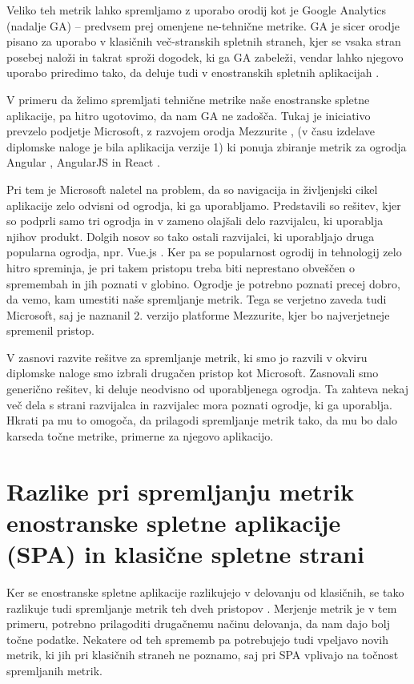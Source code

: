 \documentclass[a4paper, 12pt]{book}
\begin{document}
Veliko teh metrik lahko spremljamo z uporabo orodij kot je Google Analytics \cite{ga_website} (nadalje GA) -- predvsem prej omenjene ne-tehnične metrike. GA je sicer orodje pisano za uporabo v klasičnih več-stranskih spletnih straneh, kjer se vsaka stran posebej naloži in takrat sproži dogodek, ki ga GA zabeleži, vendar lahko njegovo uporabo priredimo tako, da deluje tudi v enostranskih spletnih aplikacijah \cite{ga_spa}.

V primeru da želimo spremljati tehnične metrike naše enostranske spletne aplikacije, pa hitro ugotovimo, da nam GA ne zadošča. Tukaj je iniciativo prevzelo podjetje Microsoft, z razvojem orodja Mezzurite \cite{mezzurite_website}, (v času izdelave diplomske naloge je bila aplikacija verzije 1) ki ponuja zbiranje metrik za ogrodja Angular \cite{angular_website}, AngularJS \cite{angularjs_website} in React \cite{react_website}.

Pri tem je Microsoft naletel na problem, da so navigacija in življenjski cikel aplikacije zelo odvisni od ogrodja, ki ga uporabljamo. Predstavili so rešitev, kjer so podprli samo tri ogrodja in v zameno olajšali delo razvijalcu, ki uporablja njihov produkt. Dolgih nosov so tako ostali razvijalci, ki uporabljajo druga popularna ogrodja, npr. Vue.js \cite{vue_website}. Ker pa se popularnost ogrodij in tehnologij zelo hitro spreminja, je pri takem pristopu treba biti neprestano obveščen o spremembah in jih poznati v globino. Ogrodje je potrebno poznati  precej dobro, da vemo, kam umestiti naše spremljanje metrik. Tega se verjetno zaveda tudi Microsoft, saj je naznanil 2. verzijo platforme Mezzurite, kjer bo najverjetneje spremenil pristop.

V zasnovi razvite rešitve za spremljanje metrik, ki smo jo razvili v okviru diplomske naloge smo izbrali drugačen pristop kot Microsoft. Zasnovali smo generično rešitev, ki deluje neodvisno od uporabljenega ogrodja. Ta zahteva nekaj več dela s strani razvijalca in razvijalec mora poznati ogrodje, ki ga uporablja. Hkrati pa mu to omogoča, da prilagodi spremljanje metrik tako, da mu bo dalo karseda točne metrike, primerne za njegovo aplikacijo.

\chapter{Razlike pri spremljanju metrik enostranske spletne aplikacije (SPA) in klasične spletne strani}
\label{ch1}

Ker se enostranske spletne aplikacije razlikujejo v delovanju od klasičnih, se tako razlikuje tudi spremljanje metrik teh dveh pristopov \cite{spa_vs_multi} \cite{spa_blakit}. Merjenje metrik je v tem primeru, potrebno prilagoditi drugačnemu načinu delovanja, da nam dajo bolj točne podatke. Nekatere od teh sprememb pa potrebujejo tudi vpeljavo novih metrik, ki jih pri klasičnih straneh ne poznamo, saj pri SPA vplivajo na točnost spremljanih metrik.
\end{document}
